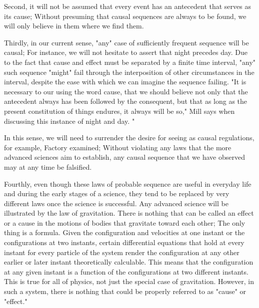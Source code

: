 \documentclass[a4paper,12pt]{book}[2004/02/16]
\theoremstyle{ilemma}
\theoremstyle{itheorem}
\theoremstyle{iother}
\theoremstyle{icorollary}
\theoremstyle{numcorollary}
\theoremstyle{idefinition}
\begin{document}
Second, it will not be assumed that every event has an antecedent that serves as its cause; Without presuming that causal sequences are always to be found, we will only believe in them where we find them.

Thirdly, in our current sense, "any" case of sufficiently frequent sequence will be causal; For instance, we will not hesitate to assert that night precedes day. Due to the fact that cause and effect must be separated by a finite time interval, "any" such sequence "might" fail through the interposition of other circumstances in the interval, despite the ease with which we can imagine the sequence failing. "It is necessary to our using the word cause, that we should believe not only that the antecedent always has been followed by the consequent, but that as long as the present constitution of things endures, it always will be so," Mill says when discussing this instance of night and day. "

In this sense, we will need to surrender the desire for seeing as causal
regulations, for example, Factory examined; Without violating any laws that the more advanced sciences aim to establish, any causal sequence that we have observed may at any time be falsified.

Fourthly, even though these laws of probable sequence are useful in everyday life and during the early stages of a science, they tend to be replaced by very different laws once the science is successful. Any advanced science will be illustrated by the law of gravitation. There is nothing that can be called an effect or a cause in the motions of bodies that gravitate toward each other; The only thing is a formula. Given the configuration and velocities at one instant or the configurations at two instants, certain differential equations that hold at every instant for every particle of the system render the configuration at any other earlier or later instant theoretically calculable. This means that the configuration at any given instant is a function of the configurations at two different instants. This is true for all of physics, not just the special case of gravitation. However, in such a system, there is nothing that could be properly referred to as "cause" or "effect."
\end{document}
